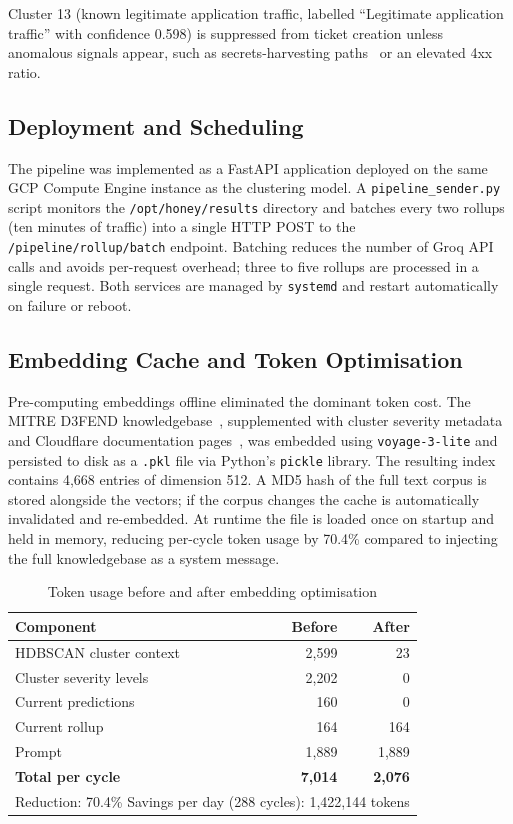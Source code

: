 \documentclass[12pt, a4paper]{report}   %
\begin{document}
Cluster 13 (known legitimate application traffic, labelled ``Legitimate application
traffic'' with confidence 0.598) is suppressed from ticket creation unless anomalous
signals appear, such as secrets-harvesting paths~\cite{owasp-api8} or an elevated 
4xx ratio.

\subsection{Deployment and Scheduling}

The pipeline was implemented as a FastAPI application deployed on the same GCP
Compute Engine instance as the clustering model. A \texttt{pipeline\_sender.py}
script monitors the \texttt{/opt/honey/results} directory and batches every two
rollups (ten minutes of traffic) into a single HTTP POST to the
\texttt{/pipeline/rollup/batch} endpoint. Batching reduces the number of Groq API
calls and avoids per-request overhead; three to five rollups are processed in a
single request. Both services are managed by \texttt{systemd} and restart
automatically on failure or reboot.

\subsection{Embedding Cache and Token Optimisation}

Pre-computing embeddings offline eliminated the dominant token cost. The MITRE
D3FEND knowledgebase~\cite{d3fend}, supplemented with cluster severity metadata and 
Cloudflare documentation pages~\cite{cf-how-works}, was embedded using 
\texttt{voyage-3-lite} and persisted to disk as a \texttt{.pkl} file via Python's 
\texttt{pickle} library. The resulting index contains 4,668 entries of dimension 512. 
A MD5 hash of the full text corpus is stored alongside the vectors; if the corpus 
changes the cache is automatically invalidated and re-embedded. At runtime the file 
is loaded once on startup and held in memory, reducing per-cycle token usage by 70.4\% 
compared to injecting the full knowledgebase as a system message.

\begin{table}[H]
\centering
\caption{Token usage before and after embedding optimisation}
\begin{tabular}{lrr}
\hline
\textbf{Component} & \textbf{Before} & \textbf{After} \\
\hline
HDBSCAN cluster context   & 2,599 & 23    \\
Cluster severity levels   & 2,202 & 0     \\
Current predictions       & 160   & 0     \\
Current rollup            & 164   & 164   \\
Prompt                    & 1,889 & 1,889 \\
\hline
\textbf{Total per cycle}  & \textbf{7,014} & \textbf{2,076} \\
\hline
\multicolumn{3}{l}{Reduction: 70.4\% \quad Savings per day (288 cycles): 
  1,422,144 tokens} \\
\hline
\end{tabular}
\label{tab:token-optimisation}
\end{table}
\end{document}
